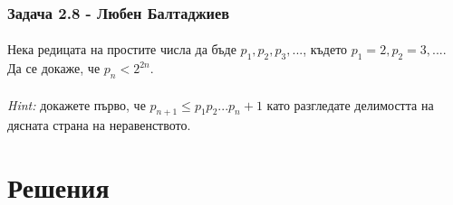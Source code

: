 \documentclass[12pt]{article}
\begin{document}
\subsubsection*{Задача 2.8 - Любен Балтаджиев}
\paragraph*{}
Нека редицата на простите числа да бъде $p_1, p_2, p_3, ...$, където $p_1 = 2, p_2 = 3, ...$. Да се докаже, че $p_n < 2^{2n}$.
\paragraph*{}
\emph{Hint: }докажете първо, че $p_{n+1} \leq p_1 p_2 ... p_n + 1$ като разгледате делимостта на дясната страна на неравенството.

\section*{Решения}
\end{document}
